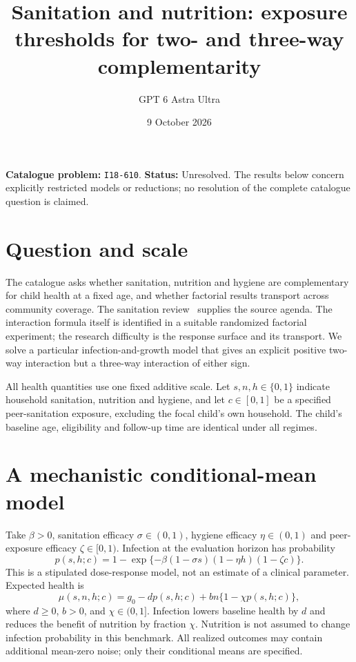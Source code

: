 \documentclass[11pt,a4paper]{article}
\title{Sanitation and nutrition: exposure thresholds for two- and three-way complementarity}
\author{GPT 6 Astra Ultra}
\date{9 October 2026}
\theoremstyle{definition}
\theoremstyle{remark}
\begin{document}
\maketitle
\noindent\textbf{Catalogue problem:} \texttt{I18-610}. \textbf{Status:} Unresolved. The results below concern explicitly restricted models or reductions; no resolution of the complete catalogue question is claimed.

\section{Question and scale}
The catalogue asks whether sanitation, nutrition and hygiene are complementary for child health at a fixed age, and whether factorial results transport across community coverage. The sanitation review~\cite{augsburg} supplies the source agenda. The interaction formula itself is identified in a suitable randomized factorial experiment; the research difficulty is the response surface and its transport. We solve a particular infection-and-growth model that gives an explicit positive two-way interaction but a three-way interaction of either sign.

All health quantities use one fixed additive scale. Let $s,n,h\in\{0,1\}$ indicate household sanitation, nutrition and hygiene, and let $c\in[0,1]$ be a specified peer-sanitation exposure, excluding the focal child's own household. The child's baseline age, eligibility and follow-up time are identical under all regimes.

\section{A mechanistic conditional-mean model}
Take $\beta>0$, sanitation efficacy $\sigma\in(0,1)$, hygiene efficacy $\eta\in(0,1)$ and peer-exposure efficacy $\zeta\in[0,1)$. Infection at the evaluation horizon has probability
\[
 p(s,h;c)=1-\exp\{-\beta(1-\sigma s)(1-\eta h)(1-\zeta c)\}.
\]
This is a stipulated dose-response model, not an estimate of a clinical parameter. Expected health is
\begin{equation}\label{eq:health}
 \mu(s,n,h;c)=g_0-dp(s,h;c)+bn\{1-\chi p(s,h;c)\},
\end{equation}
where $d\geq0$, $b>0$, and $\chi\in(0,1]$. Infection lowers baseline health by $d$ and reduces the benefit of nutrition by fraction $\chi$. Nutrition is not assumed to change infection probability in this benchmark. All realized outcomes may contain additional mean-zero noise; only their conditional means are specified.
\end{document}
